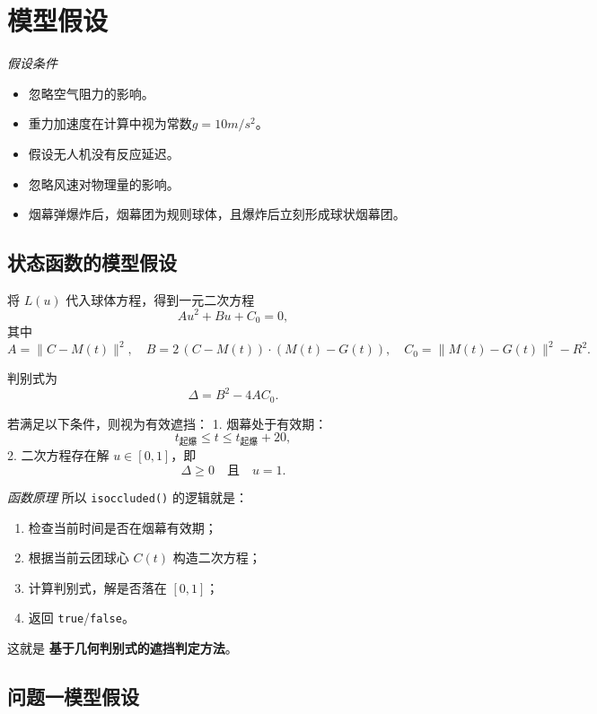 \documentclass{article}
\begin{document}
\section{模型假设}

\textit{假设条件}
\begin{itemize}
    \item 忽略空气阻力的影响。
    \item 重力加速度在计算中视为常数$g = 10m/s^2$。
    \item 假设无人机没有反应延迟。
    \item 忽略风速对物理量的影响。
    \item 烟幕弹爆炸后，烟幕团为规则球体，且爆炸后立刻形成球状烟幕团。
\end{itemize}
\subsection{状态函数的模型假设}
将 $L(u)$ 代入球体方程，得到一元二次方程
\[
A u^2 + B u + C_0 = 0,
\]
其中
\[
A = \|C - M(t)\|^2, \quad
B = 2\,(C - M(t)) \cdot (M(t) - G(t)), \quad
C_0 = \|M(t) - G(t)\|^2 - R^2.
\]

判别式为
\[
\Delta = B^2 - 4AC_0.
\]

若满足以下条件，则视为有效遮挡：
1. 烟幕处于有效期：
\[
t_{\text{起爆}} \leq t \leq t_{\text{起爆}} + 20,
\]
2. 二次方程存在解 $u \in [0,1]$，即
\[
\Delta \geq 0 \quad \text{且} \quad u = 1.
\]

\textit{函数原理}
所以 \texttt{isoccluded()} 的逻辑就是：

\begin{enumerate}[leftmargin=*,label=\arabic*.]
  \item 检查当前时间是否在烟幕有效期；
  \item 根据当前云团球心 \(C(t)\) 构造二次方程；
  \item 计算判别式，解是否落在 \([0,1]\)；
  \item 返回 \texttt{true}/\texttt{false}。
\end{enumerate}

这就是 \textbf{基于几何判别式的遮挡判定方法}。

\subsection{问题一模型假设}

\begin{center}
\end{center}
\end{document}

